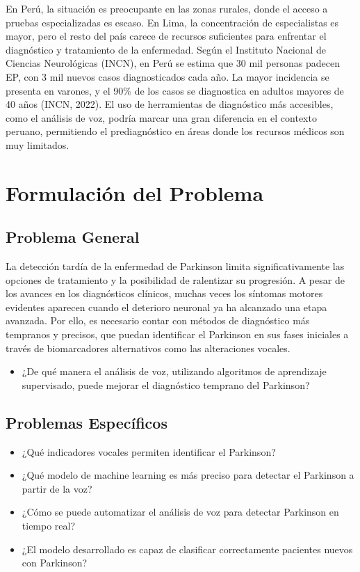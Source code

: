 \documentclass[listof=nochaptergap,12pt,times,authoryear]{report}
\begin{document}
En Perú, la situación es preocupante en las zonas rurales, donde el acceso a pruebas especializadas es escaso. En Lima, la concentración de especialistas es mayor, pero el resto del país carece de recursos suficientes para enfrentar el diagnóstico y tratamiento de la enfermedad. Según el Instituto Nacional de Ciencias Neurológicas (INCN), en Perú se estima que 30 mil personas padecen EP, con 3 mil nuevos casos diagnosticados cada año. La mayor incidencia se presenta en varones, y el 90\% de los casos se diagnostica en adultos mayores de 40 años (INCN, 2022). El uso de herramientas de diagnóstico más accesibles, como el análisis de voz, podría marcar una gran diferencia en el contexto peruano, permitiendo el prediagnóstico en áreas donde los recursos médicos son muy limitados.


\section{Formulación del Problema}

\subsection{Problema General}
La detección tardía de la enfermedad de Parkinson limita significativamente las opciones de tratamiento y la posibilidad de ralentizar su progresión. A pesar de los avances en los diagnósticos clínicos, muchas veces los síntomas motores evidentes aparecen cuando el deterioro neuronal ya ha alcanzado una etapa avanzada. Por ello, es necesario contar con métodos de diagnóstico más tempranos y precisos, que puedan identificar el Parkinson en sus fases iniciales a través de biomarcadores alternativos como las alteraciones vocales.

\begin{itemize}  
    \item ¿De qué manera el análisis de voz, utilizando algoritmos de aprendizaje supervisado, puede mejorar el diagnóstico temprano del Parkinson?
   
\end{itemize}

\subsection{Problemas Específicos}  
\begin{itemize}  
    \item ¿Qué indicadores vocales permiten identificar el Parkinson?  
    \item ¿Qué modelo de machine learning es más preciso para detectar el Parkinson a partir de la voz?  
    \item ¿Cómo se puede automatizar el análisis de voz para detectar Parkinson en tiempo real?  
    \item ¿El modelo desarrollado es capaz de clasificar correctamente pacientes nuevos con Parkinson?  
\end{itemize}
\end{document}
